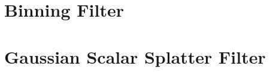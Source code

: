 \documentclass[12pt]{article}
\begin{document}
\section{Binning Filter}


\section{Gaussian Scalar Splatter Filter}

\section{}



\end{document}
